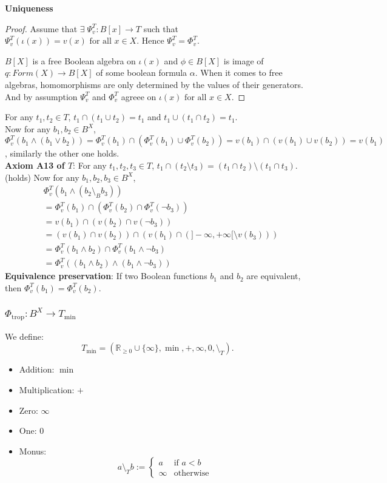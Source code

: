 \textbf{Uniqueness}
\begin{proof}
Assume that $\exists\;\Psi_v^T:B[x]\rightarrow T$ such that $\Psi_v^T(\iota(x))=v(x)\text{ for all }x \in X$. Hence $\Psi_v^T=\Phi_v^T$.

$B[X]$ is a free Boolean algebra on $\iota(x)$  and $\phi \in B[X]$ is image of $q:Form(X)\rightarrow B[X]$ of some boolean formula $\alpha$.  When it comes to free algebras, homomorphisms 
are only determined by the values of their generators. And by assumption $\Psi_v^T$ and $\Phi_v^T$ agreee on $\iota(x) \text{ for all } x \in X$.
\end{proof}
For any $t_1,t_2 \in T$, $t_1 \cap (t_1 \cup t_2) = t_1$ and $t_1 \cup (t_1 \cap t_2) = t_1$.\\
Now for any $b_1,b_2 \in B^X$, $\Phi_v^T(b_1 \wedge (b_1 \lor b_2)) = \Phi_v^T(b_1) \cap (\Phi_v^T(b_1) \cup \Phi_v^T(b_2)) = v(b_1) \cap (v(b_1) \cup v(b_2)) = v(b_1)$, similarly the other one holds.\\
\textbf{Axiom A13 of $T$}:\newline
For any $t_1,t_2,t_3 \in T$, $t_1 \cap (t_2 \setminus t_3) = (t_1 \cap t_2) \setminus (t_1 \cap t_3)$.\\ (holds)
Now for any $b_1, b_2, b_3 \in B^X$,
\[
\begin{aligned}
&\Phi_v^T(b_1 \wedge (b_2 \setminus_B b_3))\\ 
&= \Phi_v^T(b_1) \cap (\Phi_v^T(b_2) \cap \Phi_v^T(\neg b_3)) \\
&= v(b_1) \cap (v(b_2) \cap v(\neg b_3)) \\
&= (v(b_1) \cap v(b_2)) \cap (v(b_1) \cap (]-\infty,+\infty[ \setminus v(b_3))) \\
&= \Phi_v^T(b_1 \wedge b_2) \cap \Phi_v^T(b_1 \wedge \neg b_3) \\
&= \Phi_v^T((b_1 \wedge b_2) \wedge (b_1 \wedge \neg b_3))
\end{aligned}
\]
\textbf{Equivalence preservation}:\newline
If two Boolean functions $b_1$ and $b_2$ are equivalent, then $\Phi_v^T(b_1) = \Phi_v^T(b_2)$.



\subsubsection{$\Phi_{\mathrm{trop}}: B^X \to T_{\min}$}

We define:
$$
T_{\min} = (\mathbb{R}_{\ge 0} \cup \{\infty\},\min,+,\infty,0,\setminus_T).
$$
\begin{itemize}
    \item Addition: \(\min\)
    \item Multiplication: \(+\)
    \item Zero: \(\infty\)
    \item One: \(0\)
    \item Monus:
    \[
    a \setminus_T b :=
    \begin{cases}
        a & \text{if } a < b \\
        \infty & \text{otherwise}
    \end{cases}
    \]
\end{itemize}



